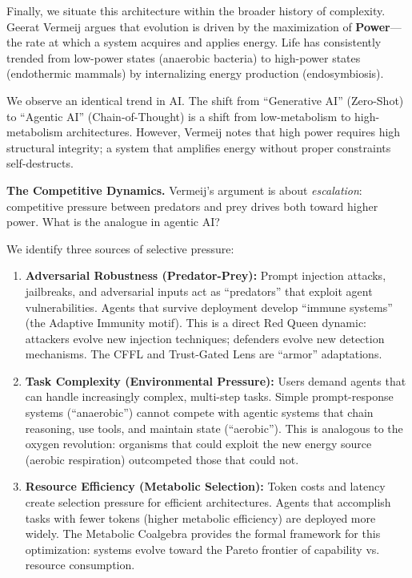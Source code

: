 Finally, we situate this architecture within the broader history of complexity. Geerat Vermeij \cite{vermeij2023power}
argues that evolution is driven by the maximization of \textbf{Power}---the rate at which a system acquires and
applies energy. Life has consistently trended from low-power states (anaerobic bacteria) to high-power states
(endothermic mammals) by internalizing energy production (endosymbiosis).

We observe an identical trend in AI. The shift from ``Generative AI'' (Zero-Shot) to ``Agentic AI'' (Chain-of-Thought)
is a shift from low-metabolism to high-metabolism architectures. However, Vermeij notes that high power requires
high structural integrity; a system that amplifies energy without proper constraints self-destructs.

\textbf{The Competitive Dynamics.} Vermeij's argument is about \textit{escalation}: competitive pressure
between predators and prey drives both toward higher power. What is the analogue in agentic AI?

We identify three sources of selective pressure:
\begin{enumerate}[leftmargin=*]
\item \textbf{Adversarial Robustness (Predator-Prey):} Prompt injection attacks, jailbreaks, and adversarial
inputs act as ``predators'' that exploit agent vulnerabilities. Agents that survive deployment develop
``immune systems'' (the Adaptive Immunity motif). This is a direct Red Queen dynamic: attackers evolve new
injection techniques; defenders evolve new detection mechanisms. The CFFL and Trust-Gated Lens are
``armor'' adaptations.

\item \textbf{Task Complexity (Environmental Pressure):} Users demand agents that can handle increasingly
complex, multi-step tasks. Simple prompt-response systems (``anaerobic'') cannot compete with agentic
systems that chain reasoning, use tools, and maintain state (``aerobic''). This is analogous to the
oxygen revolution: organisms that could exploit the new energy source (aerobic respiration) outcompeted
those that could not.

\item \textbf{Resource Efficiency (Metabolic Selection):} Token costs and latency create selection pressure
for efficient architectures. Agents that accomplish tasks with fewer tokens (higher metabolic efficiency)
are deployed more widely. The Metabolic Coalgebra provides the formal framework for this optimization:
systems evolve toward the Pareto frontier of capability vs. resource consumption.
\end{enumerate}

